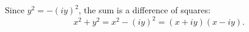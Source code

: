 Since $y^2=-(iy)^2$, the sum is a difference of squares:
\[x^2+y^2=x^2-(iy)^2=\boxed{(x+iy)(x-iy)}.\]
